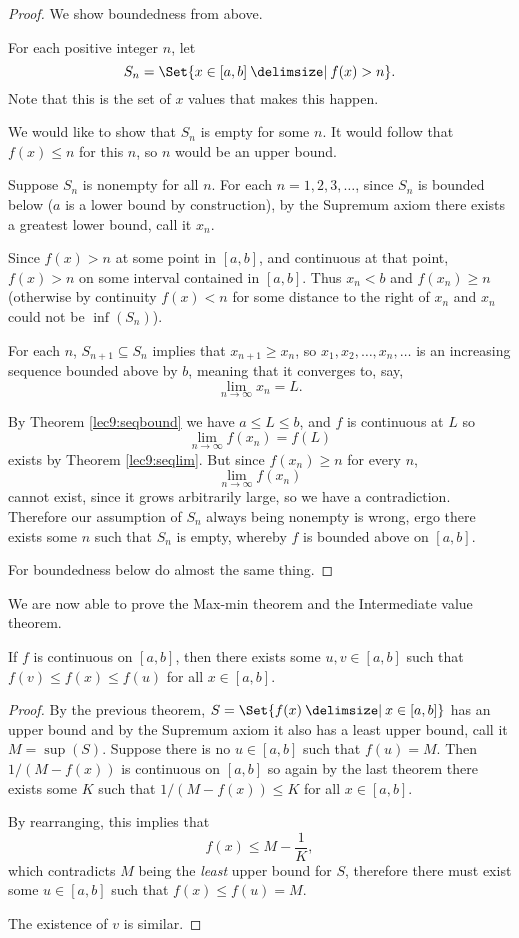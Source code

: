 \begin{proof}
	We show boundedness from above.

	For each positive integer $n$, let
	\[
		S_n = \Set{x \in [a, b] \given f(x) > n}.
	\]
	Note that this is the set of $x$ values that makes this happen.

	We would like to show that $S_n$ is empty for some $n$.
	It would follow that $f(x) \leq n$ for this $n$, so $n$ would be an upper bound.

	Suppose $S_n$ is nonempty for all $n$.
	For each $n = 1, 2, 3, \ldots$, since $S_n$ is bounded below ($a$ is a lower bound by construction), by the Supremum axiom there exists a greatest lower bound, call it $x_n$.

	Since $f(x) > n$ at some point in $[a, b]$, and continuous at that point, $f(x) > n$ on some interval contained in $[a, b]$.
	Thus $x_n < b$ and $f(x_n) \geq n$ (otherwise by continuity $f(x) < n$ for some distance to the right of $x_n$ and $x_n$ could not be $\inf(S_n)$).

	For each $n$, $S_{n + 1} \subseteq S_n$ implies that $x_{n + 1} \geq x_n$, so $x_1, x_2, \ldots, x_n, \ldots$ is an increasing sequence bounded above by $b$, meaning that it converges to, say,
	\[
		\lim_{n \to \infty} x_n = L.
	\]

	\noindent
	By Theorem \ref{lec9:seqbound} we have $a \leq L \leq b$, and $f$ is continuous at $L$ so
	\[
		\lim_{n \to \infty} f(x_n) = f(L)
	\]
	exists by Theorem \ref{lec9:seqlim}.
	But since $f(x_n) \geq n$ for every $n$,
	\[
		\lim_{n \to \infty} f(x_n)
	\]
	cannot exist, since it grows arbitrarily large, so we have a contradiction.
	Therefore our assumption of $S_n$ always being nonempty is wrong, ergo there exists some $n$ such that $S_n$ is empty, whereby $f$ is bounded above on $[a, b]$.

	For boundedness below do almost the same thing.
\end{proof}

\noindent
We are now able to prove the Max-min theorem and the Intermediate value theorem.

\begin{theorem}
	If $f$ is continuous on $[a, b]$, then there exists some $u, v \in [a, b]$ such that $f(v) \leq f(x) \leq f(u)$ for all $x \in [a, b]$.
\end{theorem}

\begin{proof}
	By the previous theorem, $S = \Set{f(x) \given x \in [a, b]}$ has an upper bound and by the Supremum axiom it also has a least upper bound, call it $M = \sup(S)$.
	Suppose there is no $u \in [a, b]$ such that $f(u) = M$.
	Then $1 / (M - f(x))$ is continuous on $[a, b]$ so again by the last theorem there exists some $K$ such that $1 / (M - f(x)) \leq K$ for all $x \in [a, b]$.

	By rearranging, this implies that
	\[
		f(x) \leq M - \frac{1}{K},
	\]
	which contradicts $M$ being the \emph{least} upper bound for $S$, therefore there must exist some $u \in [a, b]$ such that $f(x) \leq f(u) = M$.

	The existence of $v$ is similar.
\end{proof}

